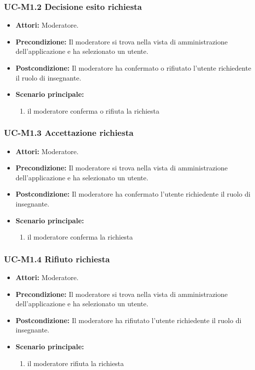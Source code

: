 \subsubsection{UC-M1.2 Decisione esito richiesta}
	\begin{itemize}
		\item \textbf{Attori:} Moderatore.
		\item \textbf{Precondizione:} Il moderatore si trova nella vista di amministrazione dell'applicazione e ha selezionato un utente.
		\item \textbf{Postcondizione:} Il moderatore ha confermato o rifiutato l'utente richiedente il ruolo di insegnante.
		\item \textbf{Scenario principale:}
			\begin{enumerate}
				\item il moderatore conferma o rifiuta la richiesta
			\end{enumerate}
	\end{itemize}

\subsubsection{UC-M1.3 Accettazione richiesta}
	\begin{itemize}
		\item \textbf{Attori:} Moderatore.
		\item \textbf{Precondizione:} Il moderatore si trova nella vista di amministrazione dell'applicazione e ha selezionato un utente.
		\item \textbf{Postcondizione:} Il moderatore ha confermato l'utente richiedente il ruolo di insegnante.
		\item \textbf{Scenario principale:}
			\begin{enumerate}
				\item il moderatore conferma la richiesta
			\end{enumerate}
	\end{itemize}

\subsubsection{UC-M1.4 Rifiuto richiesta}
	\begin{itemize}
		\item \textbf{Attori:} Moderatore.
		\item \textbf{Precondizione:} Il moderatore si trova nella vista di amministrazione dell'applicazione e ha selezionato un utente.
		\item \textbf{Postcondizione:} Il moderatore ha rifiutato l'utente richiedente il ruolo di insegnante.
		\item \textbf{Scenario principale:}
			\begin{enumerate}
				\item il moderatore rifiuta la richiesta
			\end{enumerate}
	\end{itemize}

